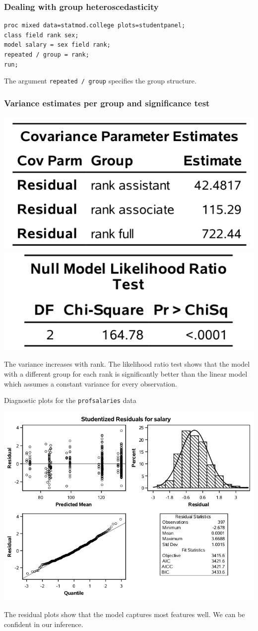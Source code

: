 \documentclass{beamer}
\begin{document}
\begin{frame}[fragile]
\frametitle{Dealing with group heteroscedasticity}
\begin{tcolorbox}[colback=white, colframe=hecblue, title=\SASlang{} code for a different variance per group]
\begin{small}
\begin{verbatim}
proc mixed data=statmod.college plots=studentpanel;
class field rank sex;
model salary = sex field rank;
repeated / group = rank;
run;
\end{verbatim}
\end{small}
\end{tcolorbox}
The argument \texttt{repeated / group} specifies the group structure.
\end{frame}
\begin{frame}
\frametitle{Variance estimates per group and significance test}
 \begin{center}
\includegraphics[width = 0.45\linewidth]{img/c5/slides6-e25}  
\includegraphics[width = 0.45\linewidth]{img/c5/slides6-e26}  
 \end{center}
The variance increases with rank. The likelihood ratio test shows that the model with a different group for each rank is significantly better than the linear model which assumes a constant variance for every observation.
\end{frame}
\begin{frame}{Diagnostic plots for the \texttt{profsalaries} data}
  \begin{center}
\includegraphics[width = 0.7\linewidth]{img/c5/slides6-e28}  
 \end{center}
 The residual plots show that the model captures most features well. We can be confident in our inference.
\end{frame}
\end{document}
